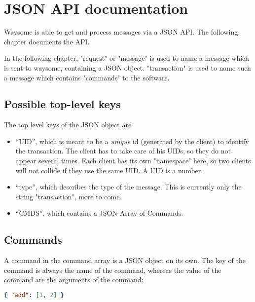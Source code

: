 \section{JSON API documentation}

    Waysome is able to get and process messages via a JSON API. The following
    chapter documents the API.

    In the following chapter, "request" or "message" is used to name a message
    which is sent to waysome, containing a JSON object. "transaction" is used to
    name such a message which contains "commands" to the software.

    \subsection{Possible top-level keys}

        The top level keys of the JSON object are

        \begin{itemize}
            \item ``UID'', which is meant to be a \emph{unique} id (generated by
                the client) to identify the transaction. The client has to take
                care of his UIDs, so they do not appear several times. Each
                client has its own "namespace" here, so two clients will not
                collide if they use the same UID.  A UID is a number.

            \item ``type'', which describes the type of the message. This is
                currently only the string "transaction", more to come.

            \item ``CMDS'', which contains a JSON-Array of Commands.
        \end{itemize}

    \subsection{Commands}

        A command in the command array is a JSON object on its own. The key of
        the command is always the name of the command, whereas the value of the
        command are the arguments of the command:

        \begin{lstlisting}[language=json]
            { "add": [1, 2] }
        \end{lstlisting}

